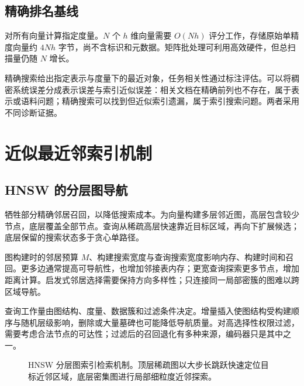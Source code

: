 \documentclass[../textbook.tex]{subfiles}
\begin{document}
\subsection{精确排名基线}
对所有向量计算指定度量。$N$ 个 $h$ 维向量需要 $O(Nh)$ 评分工作，存储原始单精度向量约 $4Nh$ 字节，尚不含标识和元数据。矩阵批处理可利用高效硬件，但总扫描量仍随 $N$ 增长。

精确搜索给出指定表示与度量下的最近对象，任务相关性通过标注评估。可以将稠密系统误差分成表示误差与索引近似误差：相关文档在精确前列也不存在，属于表示或语料问题；精确搜索可以找到但近似索引遗漏，属于索引搜索问题。两者采用不同诊断证据。

\section{近似最近邻索引机制}
\optional
\subsection{HNSW 的分层图导航}
牺牲部分精确邻居召回，以降低搜索成本。为向量构建多层邻近图，高层包含较少节点，底层覆盖全部节点\cite{malkov2018hnsw}。查询从稀疏高层快速靠近目标区域，再向下扩展候选；底层保留的搜索状态多于贪心单路径。

图构建时的邻居预算 $M$、构建搜索宽度与查询搜索宽度影响内存、构建时间和召回。更多边通常提高可导航性，也增加邻接表内存；更宽查询探索更多节点，增加距离计算。启发式邻居选择需要保持方向多样性；只连接同一局部密簇的图难以跨区域导航。

查询工作量由图结构、度量、数据簇和过滤条件决定。增量插入使图结构受构建顺序与随机层级影响，删除或大量墓碑也可能降低导航质量。对高选择性权限过滤，需要考虑合法节点的可达性；过滤后的召回退化有多种来源，编码器只是其中之一。

\begin{figure}[htbp]
\centering
{}
\caption[HNSW 分层图索引检索机制]{HNSW 分层图索引检索机制。顶层稀疏图以大步长跳跃快速定位目标近邻区域，底层密集图进行局部细粒度近邻探索。}\label{fig:ir-hnsw}
\end{figure}
\end{document}
